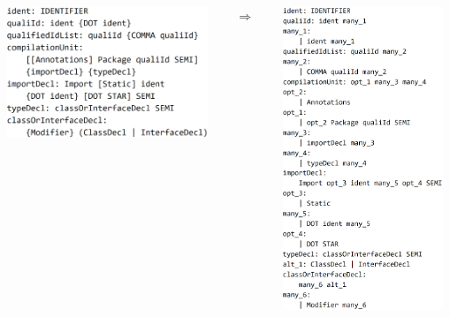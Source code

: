 \documentclass{beamer}
\begin{document}
	\begin{frame}
		\begin{columns}
			\begin{column}{6.1cm}
				\includegraphics[width=6cm]{pictures/java_before.png}
			\end{column}
			\begin{column}{.7cm}
				$ \Longrightarrow $
			\end{column}
			\begin{column}{5cm}
				\includegraphics[width=4.8cm]{pictures/java_after.png}
			\end{column}
	    \end{columns}

	\end{frame}
\end{document}
